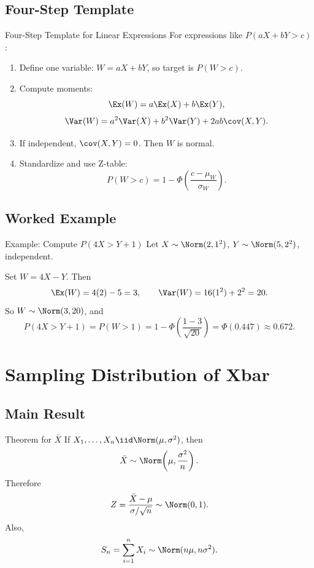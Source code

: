 \documentclass[aspectratio=169]{beamer}
\begin{document}
\subsection{Four-Step Template}
\begin{frame}{Four-Step Template for Linear Expressions}
  For expressions like \(P(aX+bY>c)\):
  \begin{enumerate}
    \item Define one variable: \(W=aX+bY\), so target is \(P(W>c)\).
    \item Compute moments:
    \[
      \Ex(W)=a\Ex(X)+b\Ex(Y),
    \]
    \[
      \Var(W)=a^2\Var(X)+b^2\Var(Y)+2ab\cov(X,Y).
    \]
    \item If independent, \(\cov(X,Y)=0\). Then \(W\) is normal.
    \item Standardize and use Z-table:
    \[
      P(W>c)=1-\Phi\!\left(\frac{c-\mu_W}{\sigma_W}\right).
    \]
  \end{enumerate}
\end{frame}

\subsection{Worked Example}
\begin{frame}{Example: Compute \(P(4X>Y+1)\)}
  Let \(X\sim\Norm(2,1^2)\), \(Y\sim\Norm(5,2^2)\), independent.

  Set \(W=4X-Y\). Then
  \[
    \Ex(W)=4(2)-5=3,
    \qquad
    \Var(W)=16(1^2)+2^2=20.
  \]
  So \(W\sim\Norm(3,20)\), and
  \[
    P(4X>Y+1)=P(W>1)
    =1-\Phi\!\left(\frac{1-3}{\sqrt{20}}\right)
    =\Phi(0.447)\approx0.672.
  \]
\end{frame}

\section{Sampling Distribution of Xbar}

\subsection{Main Result}
\begin{frame}{Theorem for \(\bar X\)}
  If \(X_1,\dots,X_n\iid\Norm(\mu,\sigma^2)\), then
  \[
    \bar X\sim\Norm\!\left(\mu,\frac{\sigma^2}{n}\right).
  \]
  Therefore
  \[
    Z=\frac{\bar X-\mu}{\sigma/\sqrt{n}}\sim\Norm(0,1).
  \]
  Also,
  \[
    S_n=\sum_{i=1}^n X_i\sim\Norm(n\mu,n\sigma^2).
  \]
\end{frame}
\end{document}
